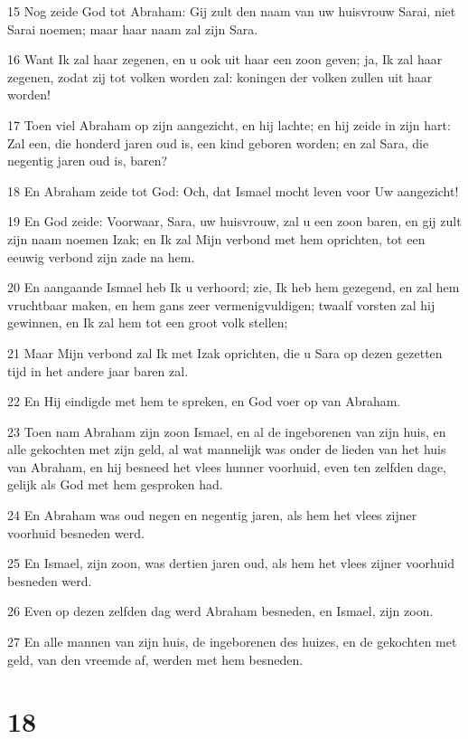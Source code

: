 \par 15 Nog zeide God tot Abraham: Gij zult den naam van uw huisvrouw Sarai, niet Sarai noemen; maar haar naam zal zijn Sara.
\par 16 Want Ik zal haar zegenen, en u ook uit haar een zoon geven; ja, Ik zal haar zegenen, zodat zij tot volken worden zal: koningen der volken zullen uit haar worden!
\par 17 Toen viel Abraham op zijn aangezicht, en hij lachte; en hij zeide in zijn hart: Zal een, die honderd jaren oud is, een kind geboren worden; en zal Sara, die negentig jaren oud is, baren?
\par 18 En Abraham zeide tot God: Och, dat Ismael mocht leven voor Uw aangezicht!
\par 19 En God zeide: Voorwaar, Sara, uw huisvrouw, zal u een zoon baren, en gij zult zijn naam noemen Izak; en Ik zal Mijn verbond met hem oprichten, tot een eeuwig verbond zijn zade na hem.
\par 20 En aangaande Ismael heb Ik u verhoord; zie, Ik heb hem gezegend, en zal hem vruchtbaar maken, en hem gans zeer vermenigvuldigen; twaalf vorsten zal hij gewinnen, en Ik zal hem tot een groot volk stellen;
\par 21 Maar Mijn verbond zal Ik met Izak oprichten, die u Sara op dezen gezetten tijd in het andere jaar baren zal.
\par 22 En Hij eindigde met hem te spreken, en God voer op van Abraham.
\par 23 Toen nam Abraham zijn zoon Ismael, en al de ingeborenen van zijn huis, en alle gekochten met zijn geld, al wat mannelijk was onder de lieden van het huis van Abraham, en hij besneed het vlees hunner voorhuid, even ten zelfden dage, gelijk als God met hem gesproken had.
\par 24 En Abraham was oud negen en negentig jaren, als hem het vlees zijner voorhuid besneden werd.
\par 25 En Ismael, zijn zoon, was dertien jaren oud, als hem het vlees zijner voorhuid besneden werd.
\par 26 Even op dezen zelfden dag werd Abraham besneden, en Ismael, zijn zoon.
\par 27 En alle mannen van zijn huis, de ingeborenen des huizes, en de gekochten met geld, van den vreemde af, werden met hem besneden.

\chapter{18}

